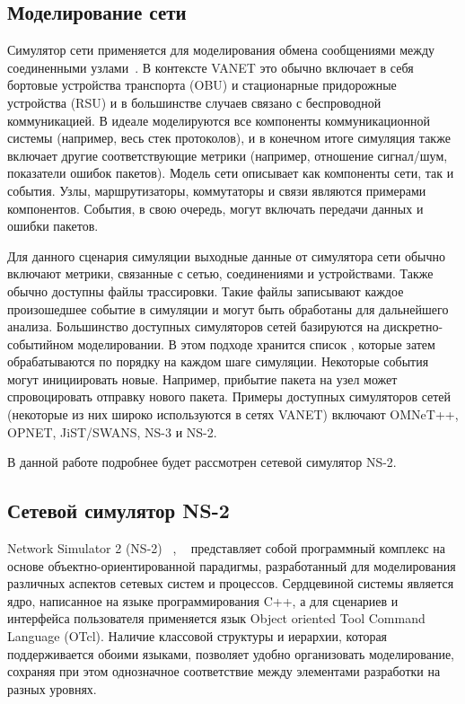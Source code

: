 \subsection*{Моделирование сети}

Симулятор сети применяется для моделирования обмена сообщениями между соединенными узлами~\cite{aljabry2021survey}. В контексте VANET это обычно включает в себя бортовые устройства транспорта (OBU) и стационарные придорожные устройства (RSU) и в большинстве случаев связано с беспроводной коммуникацией. В идеале моделируются все компоненты коммуникационной системы (например, весь стек протоколов), и в конечном итоге симуляция также включает другие соответствующие метрики (например, отношение сигнал/шум, показатели ошибок пакетов). Модель сети описывает как компоненты сети, так и события. Узлы, маршрутизаторы, коммутаторы и связи являются примерами компонентов. События, в свою очередь, могут включать передачи данных и ошибки пакетов.

Для данного сценария симуляции выходные данные от симулятора сети обычно включают метрики, связанные с сетью, соединениями и устройствами. Также обычно доступны файлы трассировки. Такие файлы записывают каждое произошедшее событие в симуляции и могут быть обработаны для дальнейшего анализа. Большинство доступных симуляторов сетей базируются на дискретно-событийном моделировании. В этом подходе хранится список , которые затем обрабатываются по порядку на каждом шаге симуляции. Некоторые события могут инициировать новые. Например, прибытие пакета на узел может спровоцировать отправку нового пакета. Примеры доступных симуляторов сетей (некоторые из них широко используются в сетях VANET) включают OMNeT++, OPNET, JiST/SWANS, NS-3 и NS-2.

В данной работе подробнее будет рассмотрен сетевой симулятор NS-2.

\subsection*{Сетевой симулятор NS-2}

Network Simulator 2 (NS-2) ~\cite{issariyakul2009introduction}, ~\cite{mahrenholz2004real} представляет собой программный комплекс на основе объектно-ориентированной парадигмы, разработанный для моделирования различных аспектов сетевых систем и процессов. Сердцевиной системы является ядро, написанное на языке программирования C++, а для сценариев и интерфейса пользователя применяется язык Object oriented Tool Command Language (OTcl). Наличие классовой структуры и иерархии, которая поддерживается обоими языками, позволяет удобно организовать моделирование, сохраняя при этом однозначное соответствие между элементами разработки на разных уровнях.


